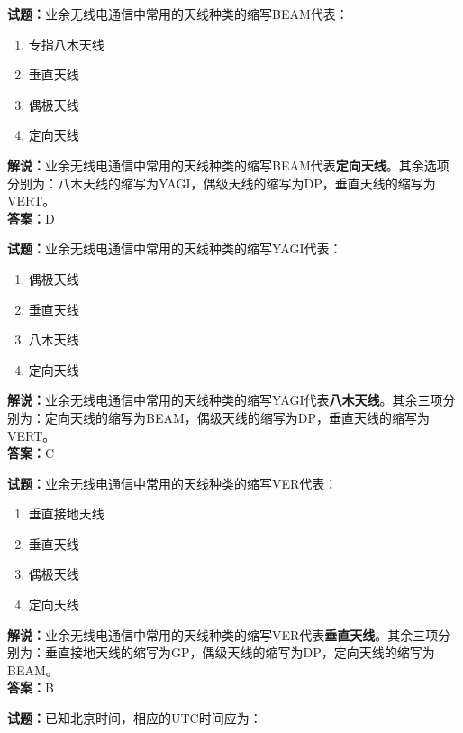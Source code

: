 \documentclass{ctexbook}
\begin{document}
\bigskip


\noindent\textbf{试题：}业余无线电通信中常用的天线种类的缩写BEAM代表：

\begin{enumerate}[leftmargin=3em]
	\item 专指八木天线
	\item 垂直天线
	\item 偶极天线
	\item 定向天线
\end{enumerate}

\noindent\textbf{解说：}业余无线电通信中常用的天线种类的缩写BEAM代表\textbf{定向天线}。其余选项分别为：八木天线的缩写为YAGI，偶级天线的缩写为DP，垂直天线的缩写为VERT。\\\noindent\textbf{答案：}D


\bigskip


\noindent\textbf{试题：}业余无线电通信中常用的天线种类的缩写YAGI代表：

\begin{enumerate}[leftmargin=3em]
	\item 偶极天线
	\item 垂直天线
	\item 八木天线
	\item 定向天线
\end{enumerate}

\noindent\textbf{解说：}业余无线电通信中常用的天线种类的缩写YAGI代表\textbf{八木天线}。其余三项分别为：定向天线的缩写为BEAM，偶级天线的缩写为DP，垂直天线的缩写为VERT。\\\noindent\textbf{答案：}C


\bigskip


\noindent\textbf{试题：}业余无线电通信中常用的天线种类的缩写VER代表：

\begin{enumerate}[leftmargin=3em]
	\item 垂直接地天线
	\item 垂直天线
	\item 偶极天线
	\item 定向天线
\end{enumerate}

\noindent\textbf{解说：}业余无线电通信中常用的天线种类的缩写VER代表\textbf{垂直天线}。其余三项分别为：垂直接地天线的缩写为GP，偶级天线的缩写为DP，定向天线的缩写为BEAM。\\\noindent\textbf{答案：}B


\bigskip


\noindent\textbf{试题：}已知北京时间，相应的UTC时间应为：
\end{document}
